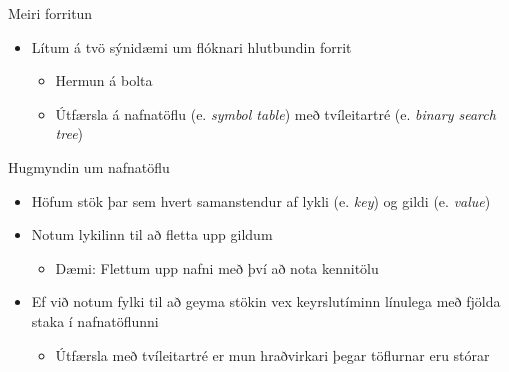 \documentclass[handout]{beamer}
\begin{document}
\begin{frame}{Meiri forritun}
    \begin{itemize}
        \item Lítum á tvö sýnidæmi um flóknari hlutbundin forrit
        \begin{itemize}
            \item Hermun á bolta
            \item Útfærsla á nafnatöflu (e. \emph{symbol table}) með tvíleitartré (e. \emph{binary search tree})
        \end{itemize}
    \end{itemize}
\end{frame}

\begin{frame}{Hugmyndin um nafnatöflu}
    \begin{itemize}
        \item Höfum stök þar sem hvert samanstendur af lykli (e. \emph{key}) og gildi (e. \emph{value})
        \item Notum lykilinn til að fletta upp gildum
        \begin{itemize}
            \item Dæmi: Flettum upp nafni með því að nota kennitölu
        \end{itemize}
        \item Ef við notum fylki til að geyma stökin vex keyrslutíminn línulega með fjölda staka í nafnatöflunni
        \begin{itemize}
            \item Útfærsla með tvíleitartré er mun hraðvirkari þegar töflurnar eru stórar
        \end{itemize}
    \end{itemize}
\end{frame}
\end{document}
